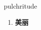 
\begin{frame}
{\huge pulchritude}
\begin{center}
\begin{enumerate}\Large
  \item \textbf{美丽}
\end{enumerate}
\end{center}
\end{frame}
